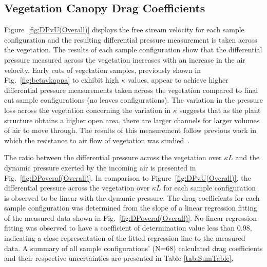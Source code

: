\documentclass[12pt]{article}
\begin{document}
\pagebreak


\subsection{Vegetation Canopy Drag Coefficients}
\label{ssec:headingscap}

Figure~\ref{fig:DPvU(Overall)} displays the free stream velocity for each sample configuration and the resulting differential pressure measurement is taken across the vegetation. The results of each sample configuration show that the differential pressure measured across the vegetation increases with an increase in the air velocity.  Early cuts of vegetation samples, previously shown in Fig.~\ref{fig:betavkappa} to exhibit high $\kappa$ values, appear to achieve higher differential pressure measurements taken across the vegetation compared to final cut sample configurations (no leaves configurations). The variation in the pressure loss across the vegetation concerning the variation in $\kappa$ suggests that as the plant structure obtains a higher open area, there are larger channels for larger volumes of air to move through. The results of this measurement follow previous work in which the resistance to air flow of vegetation was studied~\cite{Bitog2011}.

The ratio between the differential pressure across the vegetation over $\kappa L$ and the dynamic pressure exerted by the incoming air is presented in Fig.~\ref{fig:DPoveraf(Overall)}. In comparison to Figure~\ref{fig:DPvU(Overall)}, the differential pressure across the vegetation over $\kappa L$  for each sample configuration is observed to be linear with the dynamic pressure. The drag coefficients for each sample configuration was determined from the slope of a linear regression fitting of the measured data shown in Fig.~\ref{fig:DPoveraf(Overall)}. No linear regression fitting was observed to have a coefficient of determination value less than 0.98, indicating a close representation of the fitted regression line to the measured data. A summary of all sample configurations' (N=68) calculated drag coefficients and their respective uncertainties are presented in Table \ref{tab:SumTable}.
\end{document}
